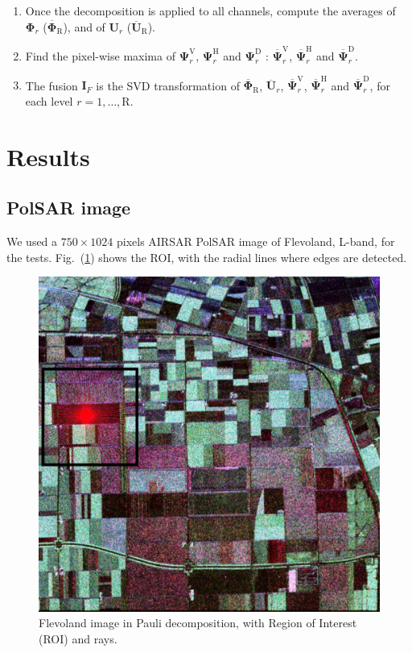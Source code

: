 \documentclass[journal]{IEEEtran}
\begin{document}
\begin{enumerate}
\item Once the decomposition is applied to all channels, 
compute the averages of $\bm\Phi_r$ ($\overline{\bm\Phi}_\text{R}$), and 
of $\bm U_r$ ($\overline{\bm U}_\text{R}$).
\item Find the pixel-wise maxima of $\bm\Psi_r^\text{V}$, $\bm\Psi_r^\text{H}$ and $\bm\Psi_r^\text{D}$ : $\overline{\bm\Psi}_r^\text{V}$, $\overline{\bm\Psi}_r^\text{H}$ and $\overline{\bm\Psi}_r^\text{D}$.
\item The fusion $\bm I_F$ is the SVD transformation of $\overline{\bm\Phi}_\text{R}$, $\overline{\bm U}_r$, $\overline{\bm\Psi}_r^\text{V}$, $\overline{\bm\Psi}_r^\text{H}$ and $\overline{\bm\Psi}_r^\text{D}$,  for each level $r=1,\dots,\text{R}$. 
\end{enumerate}

\section{Results}\label{sec_05}

\subsection{PolSAR image}

We used a $750\times 1024$ pixels AIRSAR PolSAR image of Flevoland, L-band, for the tests. 
Fig.~(\ref{flevoland_radial_4look}) shows the ROI, with the radial lines where edges are detected. 

\begin{figure}[hbt]
\centering
	\includegraphics[width=\linewidth]{flevoland_radial_4_look_black}
	\caption{Flevoland image in Pauli decomposition, with Region of Interest (ROI) and rays.}
\label{flevoland_radial_4look}
\end{figure}
\end{document}

